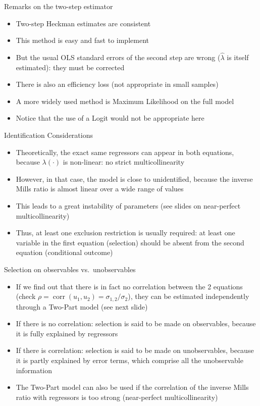\documentclass[aspectratio=169]{beamer}
\begin{document}
\begin{frame}{Remarks on the two-step estimator}
\begin{itemize}
    \item Two-step Heckman estimates are consistent
    \item This method is easy and fast to implement
    \item But the usual OLS standard errors of the second step are wrong ($\hat{\lambda}$ is itself estimated): they must be corrected
    \item There is also an efficiency loss (not appropriate in small samples)
    \item A more widely used method is Maximum Likelihood on the full model
    \item Notice that the use of a Logit would not be appropriate here
\end{itemize}
\end{frame}

\begin{frame}{Identification Considerations}
\begin{itemize}
    \item Theoretically, the exact same regressors can appear in both equations, because $\lambda(\cdot)$ is non-linear: no strict multicollinearity
    \item However, in that case, the model is close to unidentified, because the inverse Mills ratio is almost linear over a wide range of values
    \item This leads to a great instability of parameters (see slides on near-perfect multicollinearity)
    \item Thus, at least one exclusion restriction is usually required: at least one variable in the first equation (selection) should be absent from the second equation (conditional outcome)
\end{itemize}
\end{frame}

\begin{frame}{Selection on observables vs.\ unobservables}
\begin{itemize}
    \item If we find out that there is in fact no correlation between the 2 equations (check $\rho = \operatorname{corr}(u_1, u_2) = \sigma_{1,2}/\sigma_2$), they can be estimated independently through a Two-Part model (see next slide)
    \item If there is no correlation: selection is said to be made on observables, because it is fully explained by regressors
    \item If there is correlation: selection is said to be made on unobservables, because it is partly explained by error terms, which comprise all the unobservable information
    \item The Two-Part model can also be used if the correlation of the inverse Mills ratio with regressors is too strong (near-perfect multicollinearity)
\end{itemize}
\end{frame}
\end{document}
